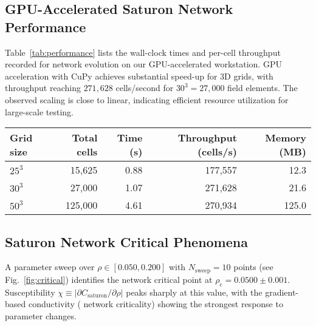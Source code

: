 \subsection{GPU-Accelerated Saturon Network Performance}
Table~\ref{tab:performance} lists the wall-clock times and per-cell throughput
recorded for \saturon{} network evolution on our GPU-accelerated workstation. 
GPU acceleration with CuPy achieves substantial speed-up for 3D \saturon{} 
grids, with throughput reaching $271,628$ cells/second for $30^{3}=27,000$ 
\saturon{} field elements. The observed scaling is close to linear, indicating 
efficient resource utilization for large-scale \posp{} testing.

\begin{table*}[t]
\caption{Computation time and throughput for representative 3D \saturon{} network sizes.
All GPU results use the CuPy back‑end with automatic CPU fallback for \posp{} research.
Numbers are averaged over three independent runs with $\rho=0.0500$, $\Delta t=50$.}
\label{tab:performance}
\begin{ruledtabular}
\begin{tabular}{lrrrr}
Grid size & Total \saturon{} cells & Time (s) & Throughput (cells/s) & Memory (MB) \\
\hline
$25^{3}$ & 15,625 & 0.88 & 177,557 & 12.3 \\
$30^{3}$ & 27,000 & 1.07 & 271,628 & 21.6 \\
$50^{3}$ & 125,000 & 4.61 & 270,934 & 125.0 \\
\end{tabular}
\end{ruledtabular}
\end{table*}

\subsection{Saturon Network Critical Phenomena}
A parameter sweep over $\rho\in[0.050,0.200]$ with $N_{\text{sweep}}=10$ points 
(see Fig.~\ref{fig:critical}) identifies the \saturon{} network critical point at 
$\rho_{\mathrm{c}}=0.0500 \pm 0.001$. Susceptibility 
$\chi\equiv|\partial C_{\text{saturon}}/\partial\rho|$ peaks sharply at this value, 
with the gradient-based conductivity (\saturon{} network criticality) showing the 
strongest response to parameter changes.

